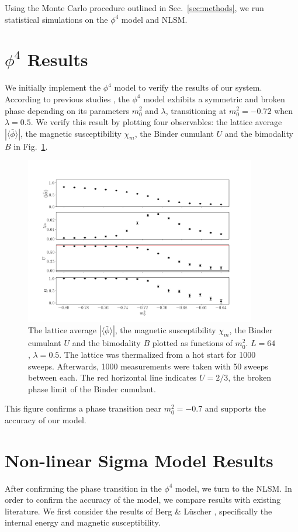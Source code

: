 Using the Monte Carlo procedure outlined in Sec.~\ref{sec:methods}, we run statistical simulations on the $\phi^4$ model and NLSM.
\section{$\phi^4$ Results}
We initially implement the $\phi^4$ model to verify the results of our system. According to previous studies \cite{chang1976, monahan2016, schaich2006}, the $\phi^4$ model exhibits a symmetric and broken phase depending on its parameters $m_0^2$ and $\lambda$, transitioning at $m_0^2 = -0.72$ when $\lambda = 0.5$. We verify this result by plotting four observables: the lattice average $|\langle\bar\phi\rangle|$, the magnetic susceptibility $\chi_m$, the Binder cumulant $U$ and the bimodality $B$ in Fig.~\ref{fig:phi4}.
\begin{figure}[h!]
    \centering
      \includegraphics[width=0.9\textwidth]{imgs/phi4.png}
      \caption{\label{fig:phi4} The lattice average $|\langle\bar\phi\rangle|$, the magnetic susceptibility $\chi_m$, the Binder cumulant $U$ and the bimodality $B$ plotted as functions of $m_0^2$. $L=64$, $\lambda=0.5$. The lattice was thermalized from a hot start for 1000 sweeps. Afterwards, 1000 measurements were taken with 50 sweeps between each. The red horizontal line indicates $U=2/3$, the broken phase limit of the Binder cumulant.}
\end{figure}
This figure confirms a phase transition near $m_0^2=-0.7$ and supports the accuracy of our model.

\section{Non-linear Sigma Model Results}
After confirming the phase transition in the $\phi^4$ model, we turn to the NLSM. In order to confirm the accuracy of the model, we compare results with existing literature. We first consider the results of Berg \& L\"uscher \cite{berg1981}, specifically the internal energy and magnetic susceptibility. 

